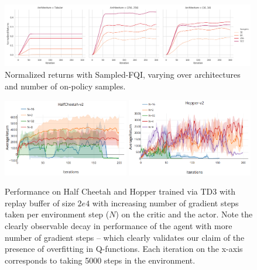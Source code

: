 \begin{figure}[h]
    \centering
    \includegraphics[width=0.99\textwidth]{images/sampling_returns}
\caption{\label{fig:sampling_arch_sweep} Normalized returns with Sampled-FQI, varying over architectures and number of on-policy samples.}
\end{figure}

\vspace{-30pt}
\begin{figure}[h]
    \centering
    \includegraphics[width=0.49\textwidth, scale=0.25]{images/grad_steps_td3.png}
    \includegraphics[width=0.49\textwidth, scale=0.25]{images/hopper_grad_steps_td3.png}
\caption{\label{fig:td3_grad_sweep} Performance on Half Cheetah and Hopper trained via TD3 with replay buffer of size $2e4$ with increasing number of gradient steps taken per environment step ($N$) on the critic and the actor. Note the clearly observable decay in performance of the agent with more number of gradient steps -- which clearly validates our claim of the presence of overfitting in Q-functions. Each iteration on the x-axis corresponds to taking 5000 steps in the environment.}

\end{figure}

\fi